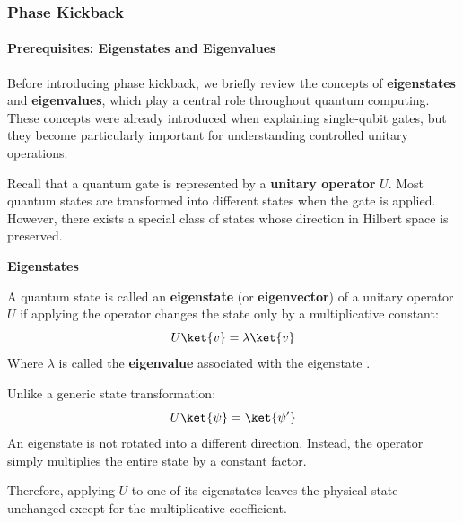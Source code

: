 \subsubsection{Phase Kickback}\label{sec:phase-kickback}

\paragraph{Prerequisites: Eigenstates and Eigenvalues}\label{ex:prerequisites-eigenstates-and-eigenvalues}

Before introducing phase kickback, we briefly review the concepts of \textbf{eigenstates} and \textbf{eigenvalues}, which play a central role throughout quantum computing. These concepts were already introduced when explaining single-qubit gates, but they become particularly important for understanding controlled unitary operations.

\highspace
Recall that a quantum gate is represented by a \textbf{unitary operator} $U$. Most quantum states are transformed into different states when the gate is applied. However, there exists a special class of states whose direction in Hilbert space is preserved.

\highspace
\begin{flushleft}
    \textcolor{Green3}{ \textbf{Eigenstates}}
\end{flushleft}
A quantum state  is called an \textbf{eigenstate} (or \textbf{eigenvector}) of a unitary operator $U$ if applying the operator changes the state only by a multiplicative constant:
\begin{equation*}
    U\ket{v} = \lambda \ket{v}
\end{equation*}
Where $\lambda$ is called the \textbf{eigenvalue} associated with the eigenstate .

\highspace
Unlike a generic state transformation:
\begin{equation*}
    U\ket{\psi} = \ket{\psi'}
\end{equation*}
An eigenstate is not rotated into a different direction. Instead, the operator simply multiplies the entire state by a constant factor.

\highspace
Therefore, applying $U$ to one of its eigenstates leaves the physical state unchanged except for the multiplicative coefficient.

